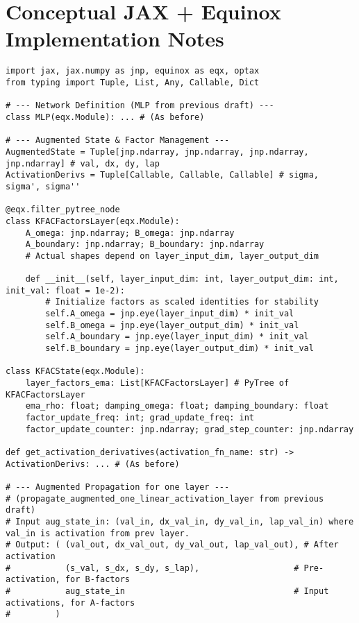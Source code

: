 \documentclass[12pt,a4paper]{article}
\begin{document}
\section{Conceptual JAX + Equinox Implementation Notes}
\begin{lstlisting}[caption={Further conceptual details for KFAC in JAX + Equinox.},label=lst:kfac_jax_conceptual]
import jax, jax.numpy as jnp, equinox as eqx, optax
from typing import Tuple, List, Any, Callable, Dict

# --- Network Definition (MLP from previous draft) ---
class MLP(eqx.Module): ... # (As before)

# --- Augmented State & Factor Management ---
AugmentedState = Tuple[jnp.ndarray, jnp.ndarray, jnp.ndarray, jnp.ndarray] # val, dx, dy, lap
ActivationDerivs = Tuple[Callable, Callable, Callable] # sigma, sigma', sigma''

@eqx.filter_pytree_node
class KFACFactorsLayer(eqx.Module):
    A_omega: jnp.ndarray; B_omega: jnp.ndarray
    A_boundary: jnp.ndarray; B_boundary: jnp.ndarray
    # Actual shapes depend on layer_input_dim, layer_output_dim

    def __init__(self, layer_input_dim: int, layer_output_dim: int, init_val: float = 1e-2):
        # Initialize factors as scaled identities for stability
        self.A_omega = jnp.eye(layer_input_dim) * init_val
        self.B_omega = jnp.eye(layer_output_dim) * init_val
        self.A_boundary = jnp.eye(layer_input_dim) * init_val
        self.B_boundary = jnp.eye(layer_output_dim) * init_val

class KFACState(eqx.Module):
    layer_factors_ema: List[KFACFactorsLayer] # PyTree of KFACFactorsLayer
    ema_rho: float; damping_omega: float; damping_boundary: float
    factor_update_freq: int; grad_update_freq: int
    factor_update_counter: jnp.ndarray; grad_step_counter: jnp.ndarray

def get_activation_derivatives(activation_fn_name: str) -> ActivationDerivs: ... # (As before)

# --- Augmented Propagation for one layer ---
# (propagate_augmented_one_linear_activation_layer from previous draft)
# Input aug_state_in: (val_in, dx_val_in, dy_val_in, lap_val_in) where val_in is activation from prev layer.
# Output: ( (val_out, dx_val_out, dy_val_out, lap_val_out), # After activation
#           (s_val, s_dx, s_dy, s_lap),                   # Pre-activation, for B-factors
#           aug_state_in                                  # Input activations, for A-factors
#         )


\end{lstlisting}
\end{document}
